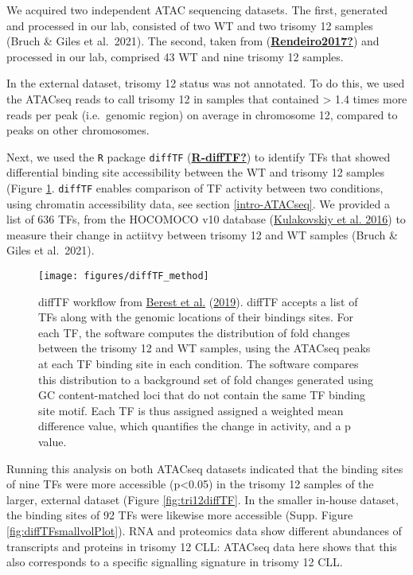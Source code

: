 \documentclass[11pt, a4paper, twosided]{book}
\begin{document}
We acquired two independent ATAC sequencing datasets. The first, generated and processed in our lab, consisted of two WT and two trisomy 12 samples (Bruch \& Giles et al.~2021). The second, taken from (\protect\hyperlink{ref-Rendeiro2017}{\textbf{Rendeiro2017?}}) and processed in our lab, comprised 43 WT and nine trisomy 12 samples.

In the external dataset, trisomy 12 status was not annotated. To do this, we used the ATACseq reads to call trisomy 12 in samples that contained \textgreater{} 1.4 times more reads per peak (i.e.~genomic region) on average in chromosome 12, compared to peaks on other chromosomes.

Next, we used the \texttt{R} package \texttt{diffTF} (\protect\hyperlink{ref-R-diffTF}{\textbf{R-diffTF?}}) to identify TFs that showed differential binding site accessibility between the WT and trisomy 12 samples (Figure \ref{fig:diffTFexplainer}. \texttt{diffTF} enables comparison of TF activity between two conditions, using chromatin accessibility data, see section \ref{intro-ATACseq}. We provided a list of 636 TFs, from the HOCOMOCO v10 database (\protect\hyperlink{ref-HOCOMOCO}{Kulakovskiy et al. 2016}) to measure their change in actiitvy between trisomy 12 and WT samples (Bruch \& Giles et al.~2021).


\begin{figure}

{\centering \texttt{[image: figures/diffTF\_method]} 

}

\caption{diffTF workflow from \protect\hyperlink{ref-Berest2019}{Berest et al.} (\protect\hyperlink{ref-Berest2019}{2019}). diffTF accepts a list of TFs along with the genomic locations of their bindings sites. For each TF, the software computes the distribution of fold changes between the trisomy 12 and WT samples, using the ATACseq peaks at each TF binding site in each condition. The software compares this distribution to a background set of fold changes generated using GC content-matched loci that do not contain the same TF binding site motif. Each TF is thus assigned assigned a weighted mean difference value, which quantifies the change in activity, and a p value.}\label{fig:diffTFexplainer}
\end{figure}
Running this analysis on both ATACseq datasets indicated that the binding sites of nine TFs were more accessible (p\textless0.05) in the trisomy 12 samples of the larger, external dataset (Figure \ref{fig:tri12diffTF}. In the smaller in-house dataset, the binding sites of 92 TFs were likewise more accessible (Supp. Figure \ref{fig:diffTFsmallvolPlot}). RNA and proteomics data show different abundances of transcripts and proteins in trisomy 12 CLL: ATACseq data here shows that this also corresponds to a specific signalling signature in trisomy 12 CLL.
\end{document}
